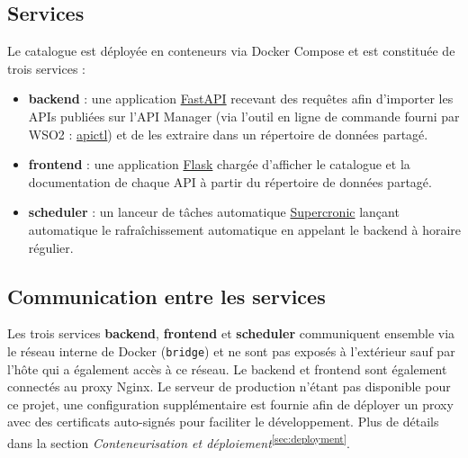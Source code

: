 \subsection{Services}
Le catalogue est déployée en conteneurs via Docker Compose et est constituée de trois services :
\begin{itemize}
    \item[$\bullet$] \textbf{backend} : une application \href{https://fastapi.tiangolo.com/}{FastAPI} recevant des requêtes afin d'importer les APIs publiées sur l'API Manager (via l'outil en ligne de commande fourni par WSO2 : \href{https://apim.docs.wso2.com/en/latest/reference/apictl/wso2-api-controller/}{apictl}) et de les extraire dans un répertoire de données partagé.
    \item[$\bullet$] \textbf{frontend} : une application \href{https://flask.palletsprojects.com/en/stable/}{Flask} chargée d'afficher le catalogue et la documentation de chaque API à partir du répertoire de données partagé.
    \item[$\bullet$] \textbf{scheduler} : un lanceur de tâches automatique \href{https://github.com/aptible/supercronic}{Supercronic} lançant automatique le rafraîchissement automatique en appelant le backend à horaire régulier.
\end{itemize}

\subsection{Communication entre les services}
Les trois services \textbf{backend}, \textbf{frontend} et \textbf{scheduler} communiquent ensemble via le réseau interne de Docker (\texttt{bridge}) et ne sont pas exposés à l'extérieur sauf par l'hôte qui a également accès à ce réseau. Le backend et frontend sont également connectés au proxy Nginx. Le serveur de production n'étant pas disponible pour ce projet, une configuration supplémentaire est fournie afin de déployer un proxy avec des certificats auto-signés pour faciliter le développement. Plus de détails dans la section \textit{Conteneurisation et déploiement}\textsuperscript{\ref{sec:deployment}}.
\newpage
